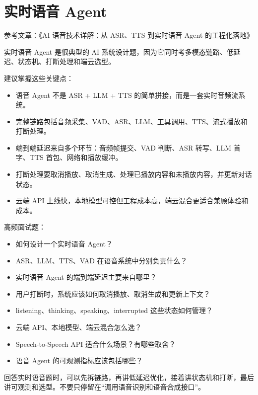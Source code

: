 \documentclass[9pt,a4paper,twocolumn]{ctexart}
\begin{document}
\section*{实时语音 Agent}


参考文章：《AI 语音技术详解：从 ASR、TTS 到实时语音 Agent 的工程化落地》



实时语音 Agent 是很典型的 AI 系统设计题，因为它同时考多模态链路、低延迟、状态机、打断处理和端云选型。



建议掌握这些关键点：


\begin{itemize}[itemsep=1pt, topsep=2pt]
  \item 语音 Agent 不是 ASR + LLM + TTS 的简单拼接，而是一套实时音频流系统。
  \item 完整链路包括音频采集、VAD、ASR、LLM、工具调用、TTS、流式播放和打断处理。
  \item 端到端延迟来自多个环节：音频帧提交、VAD 判断、ASR 转写、LLM 首字、TTS 首包、网络和播放缓冲。
  \item 打断处理要取消播放、取消生成、处理已播放内容和未播放内容，并更新对话状态。
  \item 云端 API 上线快，本地模型可控但工程成本高，端云混合更适合兼顾体验和成本。
\end{itemize}


高频面试题：


\begin{itemize}[itemsep=1pt, topsep=2pt]
  \item 如何设计一个实时语音 Agent？
  \item ASR、LLM、TTS、VAD 在语音系统中分别负责什么？
  \item 实时语音 Agent 的端到端延迟主要来自哪里？
  \item 用户打断时，系统应该如何取消播放、取消生成和更新上下文？
  \item listening、thinking、speaking、interrupted 这些状态如何管理？
  \item 云端 API、本地模型、端云混合怎么选？
  \item Speech-to-Speech API 适合什么场景？有哪些取舍？
  \item 语音 Agent 的可观测指标应该包括哪些？
\end{itemize}


回答实时语音题时，可以先拆链路，再讲低延迟优化，接着讲状态机和打断，最后讲可观测和选型。不要只停留在“调用语音识别和语音合成接口”。
\end{document}

